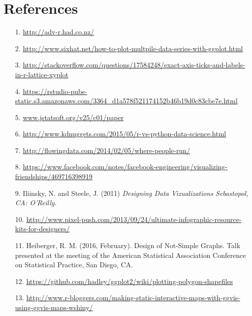 
\section{References}

\begin{frame}[allowframebreaks]
  \begin{itemize}
    \item[1.] \url{http://adv-r.had.co.nz/}
    \item[2.] \url{http://www.sixhat.net/how-to-plot-multpile-data-series-with-ggplot.html}
    \item[3.] \url{http://stackoverflow.com/questions/17584248/exact-axis-ticks-and-labels-in-r-lattice-xyplot}
    \item[4.] \url{https://rstudio-pubs-static.s3.amazonaws.com/3364_d1a578f521174152b46b19d0c83cbe7e.html}
    \item[5.] \url{www.jstatsoft.org/v25/c01/paper}
    \item[6.] \url{http://www.kdnuggets.com/2015/05/r-vs-python-data-science.html}
    \item[7.] \url{http://flowingdata.com/2014/02/05/where-people-run/}
    \item[8.] \url{https://www.facebook.com/notes/facebook-engineering/visualizing-friendships/469716398919}
    \item[9.] Iliinsky, N. and Steele, J. (2011) \itshape{Designing Data Vizualizations} \normalfont Sebastopol, CA: O'Reilly.
    \item[10.] \url{http://www.pixel-push.com/2013/09/24/ultimate-infographic-resource-kits-for-designers/}
    \item[11.] Heiberger, R. M. (2016, February). Design of Not-Simple Graphs. Talk presented at the 
     meeting of the American Statistical Association Conference on Statistical Practice, San Diego, CA.
     \item[12.] \url{https://github.com/hadley/ggplot2/wiki/plotting-polygon-shapefiles}
     \item[13.] \url{http://www.r-bloggers.com/making-static-interactive-maps-with-ggvis-using-ggvis-maps-wshiny/}
  \end{itemize}
\end{frame}




